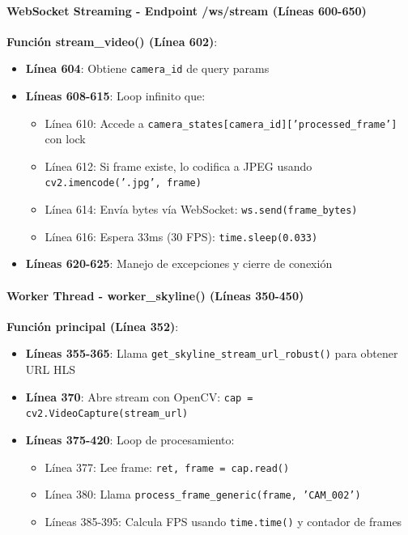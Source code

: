 \paragraph{WebSocket Streaming - Endpoint /ws/stream (Líneas 600-650)}

\textbf{Función stream\_video() (Línea 602)}:
\begin{itemize}
    \item \textbf{Línea 604}: Obtiene \texttt{camera\_id} de query params
    \item \textbf{Líneas 608-615}: Loop infinito que:
    \begin{itemize}
        \item Línea 610: Accede a \texttt{camera\_states[camera\_id]['processed\_frame']} con lock
        \item Línea 612: Si frame existe, lo codifica a JPEG usando \texttt{cv2.imencode('.jpg', frame)}
        \item Línea 614: Envía bytes vía WebSocket: \texttt{ws.send(frame\_bytes)}
        \item Línea 616: Espera 33ms (30 FPS): \texttt{time.sleep(0.033)}
    \end{itemize}
    \item \textbf{Líneas 620-625}: Manejo de excepciones y cierre de conexión
\end{itemize}

\paragraph{Worker Thread - worker\_skyline() (Líneas 350-450)}

\textbf{Función principal (Línea 352)}:
\begin{itemize}
    \item \textbf{Líneas 355-365}: Llama \texttt{get\_skyline\_stream\_url\_robust()} para obtener URL HLS
    \item \textbf{Línea 370}: Abre stream con OpenCV: \texttt{cap = cv2.VideoCapture(stream\_url)}
    \item \textbf{Líneas 375-420}: Loop de procesamiento:
    \begin{itemize}
        \item Línea 377: Lee frame: \texttt{ret, frame = cap.read()}
        \item Línea 380: Llama \texttt{process\_frame\_generic(frame, 'CAM\_002')}
        \item Líneas 385-395: Calcula FPS usando \texttt{time.time()} y contador de frames
    \end{itemize}
\end{itemize}

